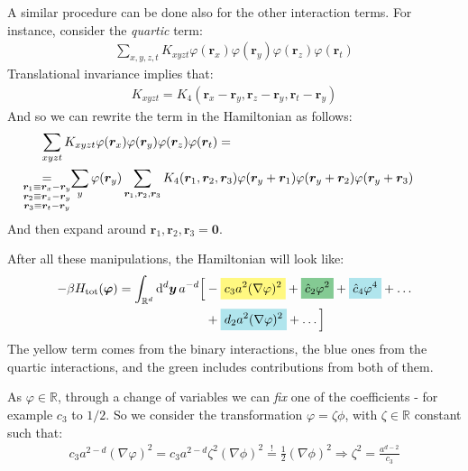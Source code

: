\documentclass[../../main.tex]{subfiles}
\begin{document}
A similar procedure can be done also for the other interaction terms. For instance, consider the \textit{quartic} term:
\begin{align*}
    \sum_{x,y,z,t} K_{xyzt} \varphi(\bm{r}_x) \varphi(\bm{r}_y) \varphi(\bm{r}_z) \varphi(\bm{r}_t)
\end{align*} 
Translational invariance implies that:
\begin{align*}
    K_{xyzt} = K_4(\bm{r}_x-\bm{r}_y, \bm{r}_z-\bm{r}_y, \bm{r}_t-\bm{r}_y)
\end{align*}
And so we can rewrite the term in the Hamiltonian as follows:
\begin{align*}
    \sum_{xyzt} K_{xyzt} \varphi(\bm{r}_x) \varphi(\bm{r}_y) \varphi(\bm{r}_z) \varphi(\bm{r}_t) =\\
    \underset{\mathclap{\substack{
        \bm{r}_1 \equiv \bm{r}_x - \bm{r}_y\\
        \bm{r}_2 \equiv \bm{r}_z - \bm{r}_y\\
        \bm{r}_3 \equiv \bm{r}_t - \bm{r}_y
    }}}{=}\quad\>  \sum_y \varphi(\bm{r}_y) \sum_{\bm{r}_1, \bm{r}_2, \bm{r}_3} K_4(\bm{r}_1, \bm{r}_2, \bm{r}_3) \varphi(\bm{r}_y + \bm{r}_1) \varphi(\bm{r}_y + \bm{r}_2) \varphi(\bm{r}_y + \bm{r}_3)\span
\end{align*}
And then expand around $\bm{r}_1, \bm{r}_2, \bm{r}_3 = \bm{0}$.

\medskip

After all these manipulations, the Hamiltonian will look like:
\begin{align*}
    - \beta H_{\mathrm{tot}}(\bm{\varphi}) = \int_{\mathbb{R}^d} \dd[d]{\bm{y}} a^{-d} \Big[&-\hlc{Yellow}{c_3 a^2 (\nabla \varphi)^2 }+ \hlc{ForestGreen}{\hat{c}_2 \varphi^2 }+ \hlc{SkyBlue}{\hat{c}_4 \varphi^4 }+ \dots \\
    &+\hlc{SkyBlue}{d_2 a^2 (\nabla \varphi)^2 }+ \dots \Big]
\end{align*}
The yellow term comes from the binary interactions, the blue ones from the quartic interactions, and the green includes contributions from both of them.

\medskip

As $\varphi \in \mathbb{R}$, through a change of variables we can \textit{fix} one of the coefficients - for example $c_3$ to $1/2$. So we consider the transformation $\varphi = \zeta \phi$, with $\zeta \in \mathbb{R}$ constant such that:
\begin{align*}
    c_3 a^{2-d} (\nabla \varphi)^2 = c_3 a^{2-d}\zeta^2(\nabla \phi)^2 \overset{!}{=}  \frac{1}{2} (\nabla \phi)^2 \Rightarrow \zeta^2 = \frac{a^{d-2}}{c_3} 
\end{align*}  
\end{document}
